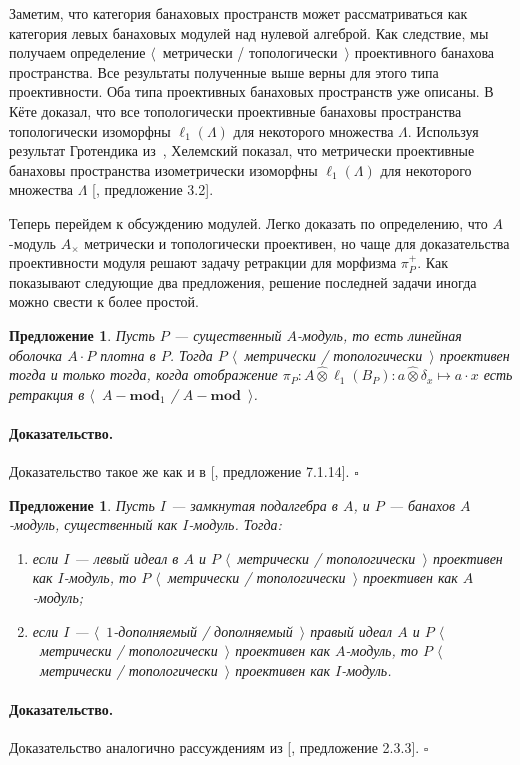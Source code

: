 \documentclass[12pt]{article}
\newcommand{\projtens}{\mathbin{\widehat{\otimes}}}
\newtheorem{proposition}[theorem]{Предложение}
\renewenvironment{proof}{\paragraph{Доказательство.}}{\hfill$\square$\medskip}
\begin{document}
Заметим, что категория банаховых пространств может рассматриваться как категория
левых банаховых модулей над нулевой алгеброй. Как следствие, мы получаем
определение $\langle$~метрически / топологически~$\rangle$ проективного банахова
пространства. Все результаты полученные выше верны для этого типа проективности.
Оба типа проективных банаховых пространств уже описаны.
В~\cite{KotheTopProjBanSp} Кёте доказал, что все топологически проективные
банаховы пространства топологически изоморфны $\ell_1(\Lambda)$ для некоторого
множества $\Lambda$. Используя результат Гротендика
из~\cite{GrothMetrProjFlatBanSp}, Хелемский показал, что метрически проективные
банаховы пространства изометрически изоморфны $\ell_1(\Lambda)$ для некоторого
множества $\Lambda$ [\cite{HelMetrFrQMod}, предложение 3.2].

Теперь перейдем к обсуждению модулей. Легко доказать по определению, что
$A$-модуль $A_\times$ метрически и топологически проективен, но чаще для
доказательства проективности модуля решают задачу ретракции для морфизма
$\pi_P^+$. Как показывают следующие два предложения, решение последней задачи
иногда можно свести к более простой.

\begin{proposition}\label{NonDegenMetTopProjCharac} Пусть $P$ --- существенный
    $A$-модуль, то есть линейная оболочка $A\cdot P$ плотна в $P$. Тогда $P$
    $\langle$~метрически / топологически~$\rangle$ проективен тогда и только
    тогда, когда отображение
    $\pi_P:A\projtens\ell_1(B_P):a\projtens\delta_x\mapsto a\cdot x$ есть
    ретракция в $\langle$~$A-\mathbf{mod}_1$ / $A-\mathbf{mod}$~$\rangle$.
\end{proposition}
\begin{proof} Доказательство такое же как и в [\cite{HelBanLocConvAlg},
    предложение 7.1.14].
\end{proof}

\begin{proposition}\label{MetTopProjUnderChangeOfAlg} Пусть $I$ --- замкнутая
    подалгебра в $A$, и $P$ --- банахов $A$-модуль, существенный как $I$-модуль.
    Тогда:
    \begin{enumerate}[label = (\roman*)]
        \item если $I$ --- левый идеал в $A$ и $P$ $\langle$~метрически /
              топологически~$\rangle$ проективен как $I$-модуль, то $P$
              $\langle$~метрически / топологически~$\rangle$ проективен
              как $A$-модуль;

        \item если $I$ ---  $\langle$~$1$-дополняемый / дополняемый~$\rangle$
              правый идеал $A$ и $P$ $\langle$~метрически /
              топологически~$\rangle$ проективен как $A$-модуль,
              то $P$ $\langle$~метрически / топологически~$\rangle$
              проективен как $I$-модуль.
    \end{enumerate}
\end{proposition}
\begin{proof} Доказательство аналогично рассуждениям из
    [\cite{RamsHomPropSemgroupAlg}, предложение 2.3.3].
\end{proof}
\end{document}
